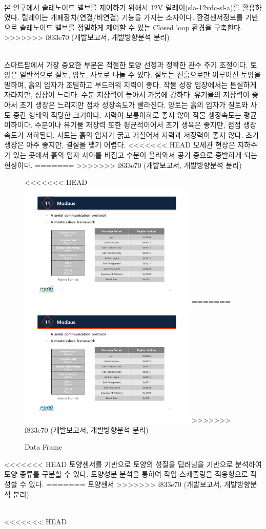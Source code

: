 \documentclass[11pt]{article}
\begin{document}
\indent \\본 연구에서 솔레노이드 밸브를 제어하기 위해서 12V 릴레이(sla-12vdc-sl-a)를 활용하였다. 릴레이는 개폐장치(연결/비연결) 기능을 가지는 소자이다. 환경센서정보를 기반으로 솔레노이드 밸브를 정밀하게 제어할 수 있는 Closed loop 환경을 구축한다. 
>>>>>>> f833e70 (개발보고서, 개발방향분석 분리)

\indent \\스마트팜에서 가장 중요한 부분은 적절한 토양 선정과 정확한 관수 주기 조절이다. 토양은 일반적으로 질토, 양토, 사토로 나눌 수 있다.
질토는 진흙으로만 이루어진 토양을 말하며, 흙의 입자가 조밀하고 부드러워 지력이 좋다. 작물 성장 입장에서는 튼실하게 자라지만, 성장이 느리다. 수분 저장력이 높아서 가뭄에 강하다. 유기물의 저장력이 좋아서 초기 생장은 느리지만 점차 성장속도가 빨라진다.
양토는 흙의 입자가 질토와 사토 중간 형태의 적당한 크기이다. 지력이 보통이하로 좋지 않아 작물 생장속도는 평균 이하이다. 수분이나 유기물 저장력 또한 평균적이어서 초기 생육은 좋지만, 점점 생장속도가 저하된다.
사토는 흙의 입자가 굵고 거칠어서 지력과 저장력이 좋지 않다. 초기 생장은 아주 좋지만, 결실을 맺기 어렵다. 
<<<<<<< HEAD
모세관 현상은 지하수가 있는 곳에서 흙의 입자 사이를 비집고 수분이 올라와서 공기 중으로 증발하게 되는 현상이다. 
=======
>>>>>>> f833e70 (개발보고서, 개발방향분석 분리)


\begin{figure}[!htbp]
    \centering
<<<<<<< HEAD
       \includegraphics[width=8.5cm]{../Figure/Frame_format.pdf}
=======
       \includegraphics[width=8.5cm]{Figure/Frame_format.pdf}
>>>>>>> f833e70 (개발보고서, 개발방향분석 분리)
       \hfil
    \caption{Data Frame}
    \label{Data_Frame}
\end{figure}

<<<<<<< HEAD
토양센서를 기반으로 토양의 성질을 딥러닝을 기반으로 분석하여 토양 종류를 구분할 수 있다. 토양성분 분석을 통하여 작업 스케줄링을 적응형으로 작성할 수 있다. 
=======
토양센서
>>>>>>> f833e70 (개발보고서, 개발방향분석 분리)


\indent \\

<<<<<<< HEAD
\end{document}
